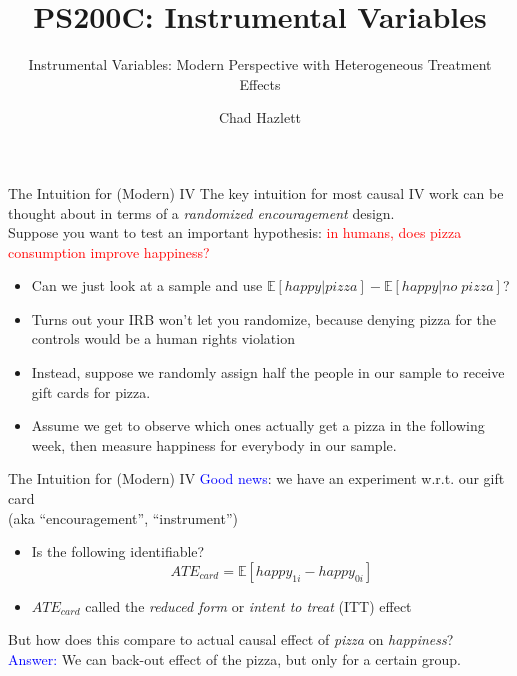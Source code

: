 \documentclass[xcolor=dvipsnames]{beamer}
\title{PS200C: Instrumental Variables}
\subtitle[ ]{Instrumental Variables: Modern Perspective with Heterogeneous Treatment Effects}
\author{Chad Hazlett}
\institute[UCLA]{UCLA\\[1ex]
  \texttt{chazlett@ucla.edu}}
\newcommand\E{\mathbb{E}}
\begin{document}
\subject{Talks}


\begin{frame}
  \titlepage
\end{frame}

\begin{frame}{The Intuition for (Modern) IV}
 The key intuition for most causal IV work can be thought about in terms of a \textit{randomized encouragement} design. \\
\bigskip
{} Suppose you want to test an important hypothesis:  \textcolor{Red}{in humans, does pizza consumption improve happiness?}
\small
\begin{itemize} 
\item<4-> Can we just look at a sample and use $\E[happy| pizza]-\E[happy|no\;pizza]$?
\item<5-> Turns out your IRB won't let you randomize, because denying pizza for the controls would be a human rights violation
\item<6-> Instead, suppose we randomly assign half the people in our sample to receive gift cards for pizza. 
\item<7-> Assume we get to observe which ones actually get a pizza in the following week, then measure happiness for everybody in our sample. 
\end{itemize}
\end{frame}


\begin{frame}{The Intuition for (Modern) IV}
\small
{} \textcolor{Blue}{Good news}: we have an experiment w.r.t. our gift card \\ (aka ``encouragement'', ``instrument'') \\

\begin{itemize}
\item<2-> Is the following identifiable? $$ATE_{card}=\E[happy_{1i} - happy_{0i}]$$
\item<4-> $ATE_{card}$ called the \textit{reduced form} or \textit{intent to treat} (ITT) effect
\end{itemize}
\medskip
{} But how does this compare to actual causal effect of \textit{pizza} on \textit{happiness}? \\
\medskip
{} \textcolor{Blue}{Answer:} We can back-out effect of the pizza, but only for a certain group.\\
\end{frame}
\end{document}
